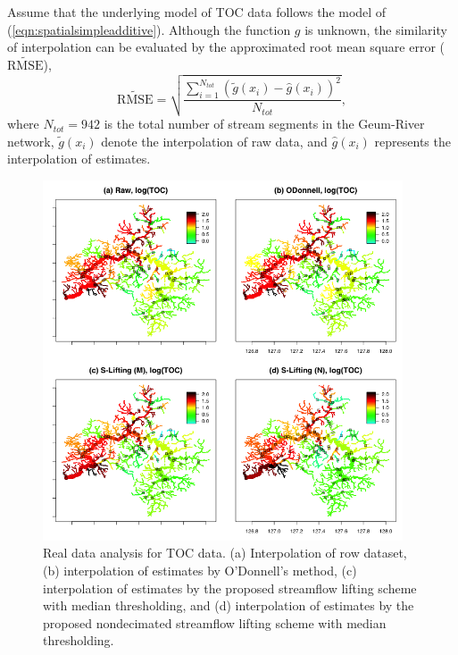 \documentclass[11pt,titlepage]{article}
\begin{document}
Assume that the underlying model of TOC data follows the model of (\ref{eqn:spatialsimpleadditive}). Although the function $g$ is unknown, the similarity of interpolation can be evaluated by the approximated root mean square error ($\widetilde{\text{RMSE}}$),
\[
\widetilde{\text{RMSE}}=\sqrt{\frac{\sum_{i=1}^{N_{tot}} (\tilde{g}(x_i)-\hat{g}(x_i))^{2}} {N_{tot}}},
\]
where $N_{tot}=942$ is the total number of stream segments in the Geum-River network, $\tilde{g}(x_i)$ denote the interpolation of raw data, and $\hat{g}(x_i)$ represents the interpolation of estimates. 

\begin{figure}
	\centering\includegraphics[width=0.95\textwidth]{Stream_result/result_TOC3.png}
	\vspace{-3mm}
	\caption{Real data analysis for TOC data.  (a) Interpolation of row dataset, (b) interpolation of estimates by O'Donnell's method, (c) interpolation of estimates by the proposed streamflow lifting scheme with median thresholding, and (d) interpolation of estimates by the proposed nondecimated streamflow lifting scheme with median thresholding.}
	\label{fig:realanalysis}
\end{figure}
\end{document}
